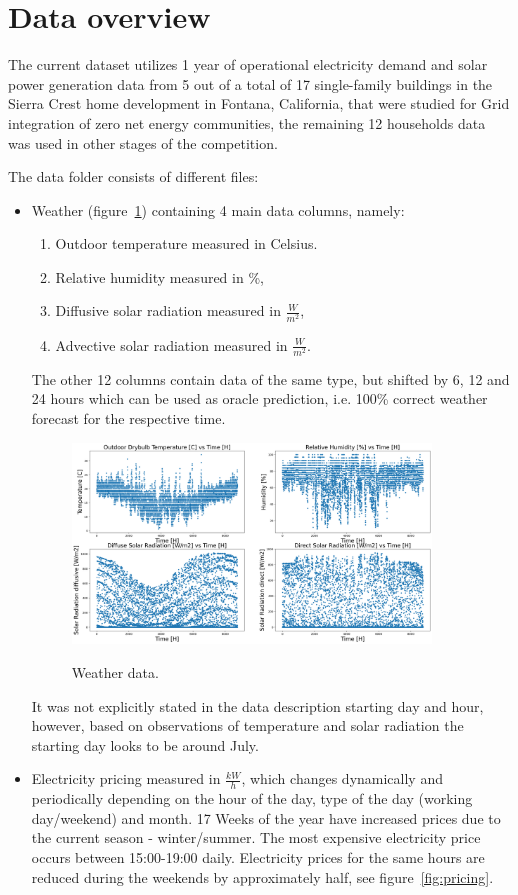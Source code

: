 \documentclass{article}
\numberwithin{equation}{subsection}
\begin{document}
\section{Data overview}

The current dataset utilizes 1 year of operational electricity demand and solar power generation data from 5 out of a total of 17 single-family buildings in the Sierra Crest home development in Fontana, California, that were studied for Grid integration of zero net energy communities, the remaining 12 households data was used in other stages of the competition.

The data folder consists of different files:
\begin{itemize}
	\item Weather (figure~\ref{fig:weather}) containing 4 main data columns, namely:
		\begin{enumerate}
			\item Outdoor temperature measured in Celsius.
			\item Relative humidity measured in \%,
			\item Diffusive solar radiation measured in $\frac{W}{m^2}$,
			\item Advective solar radiation measured in $\frac{W}{m^2}$.
		\end{enumerate}
		The other 12 columns contain data of the same type, but shifted by 6, 12 and 24 hours which can be used as oracle prediction, i.e. 100\% correct weather forecast for the respective time.
		\begin{figure}[H]
		{\centering
		  {\includegraphics[width = 0.9\textwidth]{weatherData.png}
		  }
		  \par}
		\caption{Weather data.}
		\label{fig:weather}
		\end{figure}
		
		It was not explicitly stated in the data description starting day and hour, however, based on observations of temperature and solar radiation the starting day looks to be around July.
	\item Electricity pricing measured in $\frac{kW}{h}$, which changes dynamically and periodically depending on the hour of the day, type of the day (working day/weekend) and month. 17 Weeks of the year have increased prices due to the current season - winter/summer. The most expensive electricity price occurs between 15:00-19:00 daily. Electricity prices for the same hours are reduced during the weekends by approximately half, see figure~\ref{fig:pricing}.
		

\end{itemize}
\end{document}
